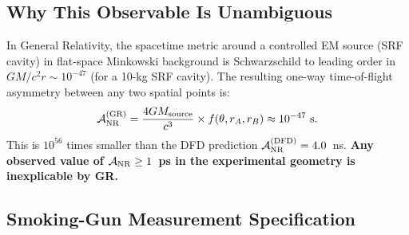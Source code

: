 \subsection{Why This Observable Is Unambiguous}
\label{ssec:unambiguous}

\begin{theorem}[GR Predicts $\mathcal{A}_{\rm NR} = 0$ for a Laboratory Psi-Source]
\label{thm:GR_zero}
In General Relativity, the spacetime metric around a controlled EM source
(SRF cavity) in flat-space Minkowski background is Schwarzschild to leading
order in $GM/c^2 r \sim 10^{-47}$ (for a 10-kg SRF cavity). The resulting
one-way time-of-flight asymmetry between any two spatial points is:
\begin{equation}
\mathcal{A}_{\rm NR}^{(\rm GR)} = \frac{4G M_{\rm source}}{c^3}
\times f(\theta, r_A, r_B) \approx 10^{-47}~\text{s}.
\label{eq:GR_zero}
\end{equation}
This is $10^{56}$ times smaller than the DFD prediction $\mathcal{A}_{\rm NR}^{(\rm DFD)}
= 4.0$~ns. \textbf{Any observed value of $\mathcal{A}_{\rm NR} \geq 1$~ps
in the experimental geometry is inexplicable by GR.}
\end{theorem}

\subsection{Smoking-Gun Measurement Specification}
\label{ssec:spec}

